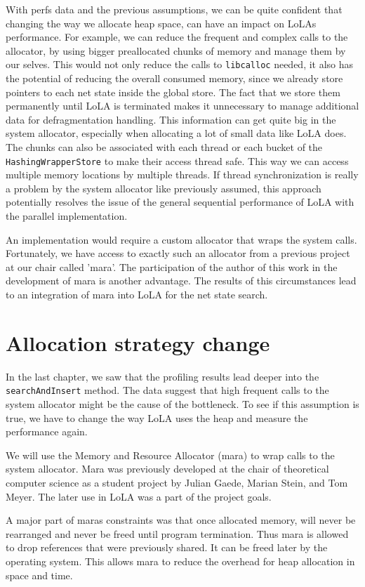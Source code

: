 With perfs data and the previous assumptions, we can be quite confident that changing the way we allocate heap space, can have an impact on LoLAs performance. For example, we can reduce the frequent and complex calls to the allocator, by using bigger preallocated chunks of memory and manage them by our selves. This would not only reduce the calls to \texttt{libcalloc} needed, it also has the potential of reducing the overall consumed memory, since we already store pointers to each net state inside the global store. The fact that we store them permanently until LoLA is terminated makes it unnecessary to manage additional data for defragmentation handling. This information can get quite big in the system allocator, especially when allocating a lot of small data like LoLA does. The chunks can also be associated with each thread or each bucket of the \texttt{Hashing\-Wrapper\-Store} to make their access thread safe. This way we can access multiple memory locations by multiple threads. If thread synchronization is really a problem by the system allocator like previously assumed, this approach potentially resolves the issue of the general sequential performance of LoLA with the parallel implementation.

An implementation would require a custom allocator that wraps the system calls. Fortunately, we have access to exactly such an allocator from a previous project at our chair called 'mara'. The participation of the author of this work in the development of mara is another advantage. The results of this circumstances lead to an integration of mara into LoLA for the net state search.

\section{Allocation strategy change}
In the last chapter, we saw that the profiling results lead deeper into the \texttt{search\-And\-Insert} method. The data suggest that high frequent calls to the system allocator might be the cause of the bottleneck. To see if this assumption is true, we have to change the way LoLA uses the heap and measure the performance again.

We will use the Memory and Resource Allocator (mara) to wrap calls to the system allocator. Mara was previously developed at the chair of theoretical computer science as a student project by Julian Gaede, Marian Stein, and Tom Meyer. The later use in LoLA was a part of the project goals.

A major part of maras constraints was that once allocated memory, will never be rearranged and never be freed until program termination. Thus mara is allowed to drop references that were previously shared. It can be freed later by the operating system. This allows mara to reduce the overhead for heap allocation in space and time.

